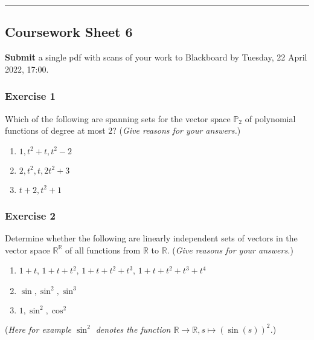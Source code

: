 \documentclass[
  12pt,
  a4paper,
  twoside]{article}
\theoremstyle{plain}
\theoremstyle{definition}
\begin{document}
\begin{center}\rule{0.5\linewidth}{0.5pt}\end{center}

\hypertarget{coursework-sheet-6}{%
\subsection{Coursework Sheet 6}\label{coursework-sheet-6}}

\textbf{Submit} a single pdf with scans of your work to Blackboard by Tuesday, 22 April 2022, 17:00.

\hypertarget{exercise-1-5}{%
\subsubsection*{Exercise 1}\label{exercise-1-5}}

Which of the following are spanning sets for the vector space
\(\mathbb{P}_2\) of polynomial functions of degree at most \(2\)? (\emph{Give
reasons for your answers.})

\begin{enumerate}
\def\labelenumi{(\alph{enumi})}
\item
  \(1, t^2+t, t^2-2\)
\item
  \(2, t^2, t, 2t^2 +3\)
\item
  \(t+2, t^2+1\)
\end{enumerate}

\hypertarget{exercise-2-5}{%
\subsubsection*{Exercise 2}\label{exercise-2-5}}

Determine whether the following are linearly independent sets of
vectors in the vector space \(\mathbb{R}^\mathbb{R}\) of all functions from \(\mathbb{R}\)
to \(\mathbb{R}\). (\emph{Give reasons for your answers.})

\begin{enumerate}
\def\labelenumi{(\alph{enumi})}
\item
  \(1+t\), \(1+t+t^2\), \(1+t+t^2+t^3\), \(1+t+t^2+t^3+t^4\)
\item
  \(\sin, \sin^2, \sin^3\)
\item
  \(1, \sin^2, \cos^2\)
\end{enumerate}

(\emph{Here for example \(\sin^2\) denotes the function \(\mathbb{R} \rightarrow \mathbb{R}, s \mapsto (\sin(s))^2\).})
\end{document}
